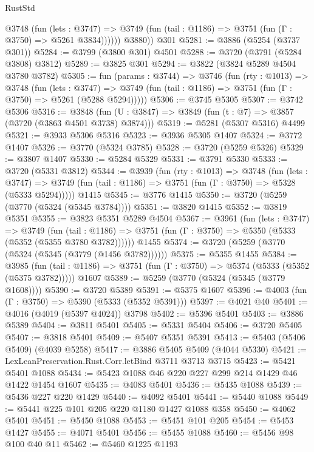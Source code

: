 \begin{lexlean}{RustStd}
\begin{coremodule}
            @3748
              (fun (lets : @3747) =>
              @3749 (fun (tail : @1186) => @3751 (fun (Γ : @3750) => @5261 @3834))))))
        @3880))
    @301
@5281 := @3886 (@5254 (@3737 @301))
@5284 := @3799 (@3800 @301) @4501
@5288 := @3720 (@3791 (@5284 @3808) @3812)
@5289 := @3825 @301
@5294 := @3822 (@3824 @5289 @4504 @3780 @3782)
@5305 := fun (params : @3744) =>
  @3746
    (fun (rty : @1013) =>
    @3748
      (fun (lets : @3747) =>
      @3749 (fun (tail : @1186) => @3751 (fun (Γ : @3750) => @5261 (@5288 @5294)))))
@5306 := @3745 @5305
@5307 := @3742 @5306
@5316 := @3848 (fun (U : @3847) => @3849 (fun (t : @7) => @3857 (@3720 (@3863 @4501 @3738) @3874)))
@5319 := @5281 (@5307 @5316) @4499
@5321 := @3933 @5306 @5316
@5323 := @3936 @5305 @1407
@5324 := @3772 @1407
@5326 := @3770 (@5324 @3785)
@5328 := @3720 (@5259 @5326)
@5329 := @3807 @1407
@5330 := @5284 @5329
@5331 := @3791 @5330
@5333 := @3720 (@5331 @3812)
@5344 := @3939
    (fun (rty : @1013) =>
    @3748
      (fun (lets : @3747) =>
      @3749 (fun (tail : @1186) => @3751 (fun (Γ : @3750) => @5328 (@5333 @5294)))))
    @1415
@5345 := @3776 @1415
@5350 := @3720 (@5259 (@3770 (@5324 (@5345 @3784))))
@5351 := @3820 @1415
@5352 := @3819 @5351
@5355 := @3823 @5351 @5289 @4504
@5367 := @3961
    (fun (lets : @3747) =>
    @3749
      (fun (tail : @1186) => @3751 (fun (Γ : @3750) => @5350 (@5333 (@5352 (@5355 @3780 @3782))))))
    @1455
@5374 := @3720 (@5259 (@3770 (@5324 (@5345 (@3779 (@1456 @3782))))))
@5375 := @5355 @1455
@5384 := @3985
    (fun (tail : @1186) => @3751 (fun (Γ : @3750) => @5374 (@5333 (@5352 (@5375 @3782)))))
    @1607
@5389 := @5259 (@3770 (@5324 (@5345 (@3779 @1608))))
@5390 := @3720 @5389
@5391 := @5375 @1607
@5396 := @4003 (fun (Γ : @3750) => @5390 (@5333 (@5352 @5391)))
@5397 := @4021 @40
@5401 := @4016 (@4019 (@5397 @4024)) @3798
@5402 := @5396 @5401
@5403 := @3886 @5389
@5404 := @3811 @5401
@5405 := @5331 @5404
@5406 := @3720 @5405
@5407 := @3818 @5401
@5409 := @5407 @5351 @5391
@5413 := @5403 (@5406 @5409) (@4039 @5258)
@5417 := @3886 @5405 @5409 (@4044 @5330)
@5421 := LexLeanPreservation.Rust.Corr.letBind @3711 @3713 @3715
@5423 := @5421 @5401 @1088
@5434 := @5423 @1088 @46 @220 @227 @299 @214 @1429 @46 @1422 @1454 @1607
@5435 := @4083 @5401
@5436 := @5435 @1088
@5439 := @5436 @227 @220 @1429
@5440 := @4092 @5401
@5441 := @5440 @1088
@5449 := @5441 @225 @101 @205 @220 @1180 @1427 @1088 @358
@5450 := @4062 @5401
@5451 := @5450 @1088
@5453 := @5451 @101 @205
@5454 := @5453 @1427
@5455 := @4071 @5401
@5456 := @5455 @1088
@5460 := @5456 @98 @100 @40 @11
@5462 := @5460 @1225 @1193

\end{coremodule}
\end{lexlean}
